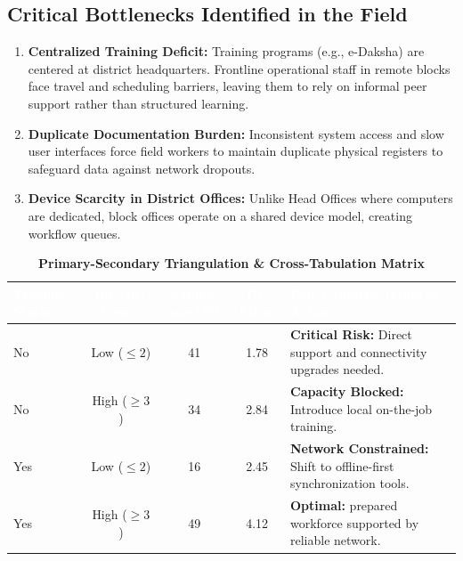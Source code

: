 \documentclass[11pt,a4paper]{article}
\begin{document}
\subsection{Critical Bottlenecks Identified in the Field}
\begin{enumerate}
  \item \textbf{Centralized Training Deficit:} Training programs (e.g., e-Daksha) are centered at district headquarters. Frontline operational staff in remote blocks face travel and scheduling barriers, leaving them to rely on informal peer support rather than structured learning.
  \item \textbf{Duplicate Documentation Burden:} Inconsistent system access and slow user interfaces force field workers to maintain duplicate physical registers to safeguard data against network dropouts.
  \item \textbf{Device Scarcity in District Offices:} Unlike Head Offices where computers are dedicated, block offices operate on a shared device model, creating workflow queues.
\end{enumerate}

\renewcommand{\arraystretch}{1.1}
\begin{table}[h!]
\centering
\footnotesize
\caption{\textbf{Primary-Secondary Triangulation \& Cross-Tabulation Matrix}}
\vspace{0.1cm}
\begin{tabularx}{\textwidth}{l c c c X}
\toprule
\rowcolor{navyblue}
\textcolor{white}{\textbf{Training Status}} & \textcolor{white}{\textbf{Internet Group}} & \textcolor{white}{\textbf{Sample size (N)}} & \textcolor{white}{\textbf{PU Mean}} & \textcolor{white}{\textbf{Policy Interpretation \& Action}} \\
\midrule
No & Low ($\le 2$) & 41 & 1.78 & \textbf{\color{crimson}Critical Risk:} Direct support and connectivity upgrades needed. \\
No & High ($\ge 3$) & 34 & 2.84 & \textbf{Capacity Blocked:} Introduce local on-the-job training. \\
Yes & Low ($\le 2$) & 16 & 2.45 & \textbf{Network Constrained:} Shift to offline-first synchronization tools. \\
\rowcolor{lightgray!50}
Yes & High ($\ge 3$) & 49 & 4.12 & \textbf{\color{forestgreen}Optimal:} prepared workforce supported by reliable network. \\
\bottomrule
\end{tabularx}
\end{table}
\end{document}
